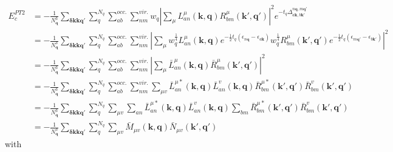 \documentclass[a4paper,12pt]{article}
\begin{document}
\begin{equation}
    \begin{split}
		E_{c}^{PT2}&=-\frac{1}{N_{\boldsymbol{q}}^3}\sum_{\boldsymbol{\delta k}\boldsymbol{k}\boldsymbol{q}'}
		\sum_{q}^{N_q}\sum_{ab}^{occ.}\sum_{nm}^{vir.}w_{q}
		\left|\sum_{\mu}L_{an}^{\mu}(\boldsymbol{k},\boldsymbol{q})R_{bm}^{\mu}(\boldsymbol{k}',\boldsymbol{q}')\right|^2
        e^{-t_q\Delta_{a\boldsymbol{k},b\boldsymbol{k}'}^{n\boldsymbol{q},m\boldsymbol{q}'}}\\
		&=-\frac{1}{N_{\boldsymbol{q}}^3}\sum_{\boldsymbol{\delta k}\boldsymbol{k}\boldsymbol{q}'}
		\sum_{q}^{N_q}\sum_{ab}^{occ.}\sum_{nm}^{vir.}
		\left|\sum_{\mu}w_{q}^{\frac 1 4}L_{an}^{\mu}(\boldsymbol{k},\boldsymbol{q})e^{-\frac{1}{2}t_q(\epsilon_{n\boldsymbol{q}}-\epsilon_{a\boldsymbol{k}})}
		w_{q}^{\frac 1 4}R_{bm}^{\mu}(\boldsymbol{k}',\boldsymbol{q}')e^{-\frac{1}{2}t_q(\epsilon_{m\boldsymbol{q}'}-\epsilon_{b\boldsymbol{k}'})}\right|^2\\
		&=-\frac{1}{N_{\boldsymbol{q}}^3}\sum_{\boldsymbol{\delta k}\boldsymbol{k}\boldsymbol{q}'}
		\sum_{q}^{N_q}\sum_{ab}^{occ.}\sum_{nm}^{vir.}
		\left|\sum_{\mu}\bar{L}_{an}^{\mu}(\boldsymbol{k},\boldsymbol{q})\bar{R}_{bm}^{\mu}(\boldsymbol{k}',\boldsymbol{q}')\right|^2\\
		&=-\frac{1}{N_{\boldsymbol{q}}^3}\sum_{\boldsymbol{\delta k}\boldsymbol{k}\boldsymbol{q}'}
		\sum_{q}^{N_q}\sum_{ab}^{occ.}\sum_{nm}^{vir.}
		\sum_{\mu v}\bar{L}_{an}^{\mu *}(\boldsymbol{k},\boldsymbol{q})\bar{L}_{an}^{v}(\boldsymbol{k},\boldsymbol{q})
		\bar{R}_{bm}^{\mu *}(\boldsymbol{k}',\boldsymbol{q}')\bar{R}_{bm}^{v}(\boldsymbol{k}',\boldsymbol{q}')\\
		&=-\frac{1}{N_{\boldsymbol{q}}^3}\sum_{\boldsymbol{\delta k}\boldsymbol{k}\boldsymbol{q}'}
		\sum_{q}^{N_q}\sum_{\mu v} 
		\sum_{an}\bar{L}_{an}^{\mu *}(\boldsymbol{k},\boldsymbol{q})\bar{L}_{an}^{v}(\boldsymbol{k},\boldsymbol{q})
		\sum_{bm}\bar{R}_{bm}^{\mu *}(\boldsymbol{k}',\boldsymbol{q}')\bar{R}_{bm}^{v}(\boldsymbol{k}',\boldsymbol{q}')\\
		&=-\frac{1}{N_{\boldsymbol{q}}^3}\sum_{\boldsymbol{\delta k}\boldsymbol{k}\boldsymbol{q}'}
		\sum_{q}^{N_q}\sum_{\mu v} 
		\bar{M}_{\mu v}(\boldsymbol{k},\boldsymbol{q})\bar{N}_{\mu v}(\boldsymbol{k}',\boldsymbol{q}')
    \end{split}
\end{equation}
with 
\end{document}
